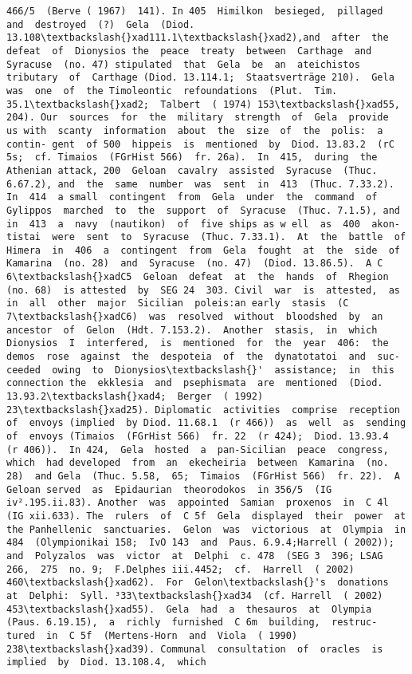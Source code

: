 \documentclass[11pt]{article}
\begin{document}
\begin{Verbatim}[commandchars=\\\{\}]
466/5  (Berve ( 1967)  141). In 405  Himilkon  besieged,  pillaged  and  destroyed  (?)  Gela  (Diod. 13.108\textbackslash{}xad111.1\textbackslash{}xad2),and  after  the  defeat  of  Dionysios the  peace  treaty  between  Carthage  and  Syracuse  (no. 47) stipulated  that  Gela  be  an  ateichistos  tributary  of  Carthage (Diod. 13.114.1;  Staatsverträge 210).  Gela  was  one  of  the Timoleontic  refoundations  (Plut.  Tim. 35.1\textbackslash{}xad2;  Talbert  ( 1974) 153\textbackslash{}xad55,  204). Our  sources  for  the  military  strength  of  Gela  provide  us with  scanty  information  about  the  size  of  the  polis:  a contin- gent  of 500  hippeis  is  mentioned  by  Diod. 13.83.2  (rC 5s;  cf. Timaios  (FGrHist 566)  fr. 26a).  In  415,  during  the  Athenian attack, 200  Geloan  cavalry  assisted  Syracuse  (Thuc. 6.67.2), and  the  same  number  was  sent  in  413  (Thuc. 7.33.2).  In  414  a small  contingent  from  Gela  under  the  command  of Gylippos  marched  to  the  support  of  Syracuse  (Thuc. 7.1.5), and  in  413  a  navy  (nautikon)  of  five ships as w ell  as  400  akon- tistai  were  sent  to  Syracuse  (Thuc. 7.33.1).  At  the  battle  of Himera  in  406  a  contingent  from  Gela  fought  at  the  side  of Kamarina  (no. 28)  and  Syracuse  (no. 47)  (Diod. 13.86.5).  A C 6\textbackslash{}xadC5  Geloan  defeat  at  the  hands  of  Rhegion  (no. 68)  is attested  by  SEG 24  303. Civil  war  is  attested,  as  in  all  other  major  Sicilian  poleis:an early  stasis  (C 7\textbackslash{}xadC6)  was  resolved  without  bloodshed  by  an ancestor  of  Gelon  (Hdt. 7.153.2).  Another  stasis,  in  which Dionysios  I  interfered,  is  mentioned  for  the  year  406:  the demos  rose  against  the  despoteia  of  the  dynatotatoi  and  suc- ceeded  owing  to  Dionysios\textbackslash{}'  assistance;  in  this  connection the  ekklesia  and  psephismata  are  mentioned  (Diod. 13.93.2\textbackslash{}xad4;  Berger  ( 1992)  23\textbackslash{}xad25). Diplomatic  activities  comprise  reception  of  envoys (implied  by Diod. 11.68.1  (r 466))  as  well  as  sending  of  envoys (Timaios  (FGrHist 566)  fr. 22  (r 424);  Diod. 13.93.4  (r 406)).  In 424,  Gela  hosted  a  pan-Sicilian  peace  congress,  which  had developed  from  an  ekecheiria  between  Kamarina  (no. 28)  and Gela  (Thuc. 5.58,  65;  Timaios  (FGrHist 566)  fr. 22).  A  Geloan served  as  Epidaurian  theorodokos  in 356/5  (IG iv².195.ii.83). Another  was  appointed  Samian  proxenos  in  C 4l  (IG xii.633). The  rulers  of  C 5f  Gela  displayed  their  power  at  the Panhellenic  sanctuaries.  Gelon  was  victorious  at  Olympia  in 484  (Olympionikai 158;  IvO 143  and  Paus. 6.9.4;Harrell ( 2002));  and  Polyzalos  was  victor  at  Delphi  c. 478  (SEG 3  396; LSAG 266,  275  no. 9;  F.Delphes iii.4452;  cf.  Harrell  ( 2002) 460\textbackslash{}xad62).  For  Gelon\textbackslash{}'s  donations  at  Delphi:  Syll. ³33\textbackslash{}xad34  (cf. Harrell  ( 2002)  453\textbackslash{}xad55).  Gela  had  a  thesauros  at  Olympia (Paus. 6.19.15),  a  richly  furnished  C 6m  building,  restruc- tured  in  C 5f  (Mertens-Horn  and  Viola  ( 1990)  238\textbackslash{}xad39). Communal  consultation  of  oracles  is  implied  by  Diod. 13.108.4,  which  
\end{Verbatim}
\end{document}

